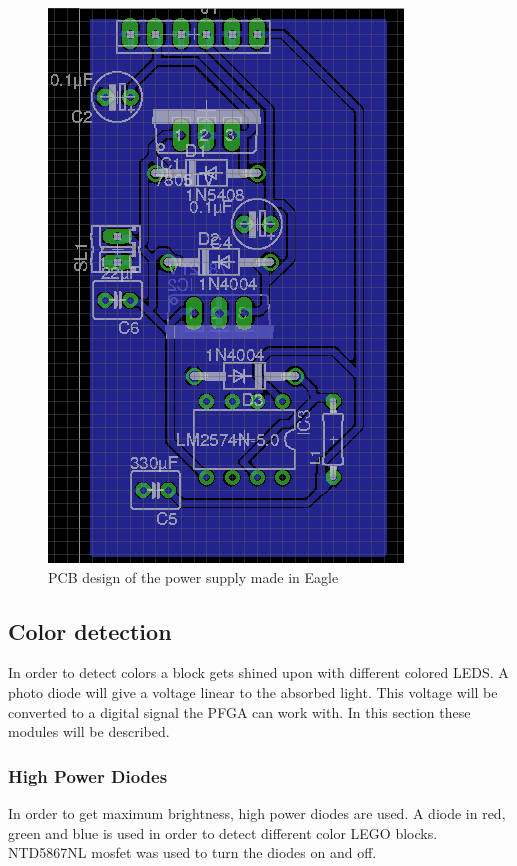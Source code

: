 \begin{figure}
\centering
\includegraphics[scale=0.5]{img/pcb_power.png}
\caption{PCB design of the power supply made in Eagle} 
\label{fig::pcb_power}
\end{figure}

\subsection{Color detection}
In order to detect colors a block gets shined upon with different colored LEDS.
A photo diode will give a voltage linear to the absorbed light.
This voltage will be converted to a digital signal the PFGA can work with.
In this section these modules will be described.
\subsubsection{High Power Diodes}
In order to get maximum brightness, high power diodes are used.
A diode in red, green and blue is used in order to detect different color LEGO blocks.
NTD5867NL mosfet was used to turn the diodes on and off.

